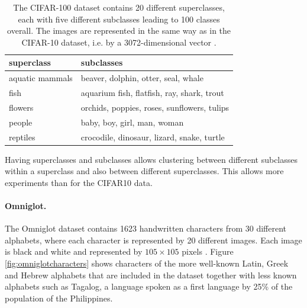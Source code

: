 \begin{table}[h]
    \centering
    \begin{tabular}{|l|l|}
    \hline
    superclass      & subclasses                                  \\ \hline
    aquatic mammals & beaver, dolphin, otter, seal, whale         \\
    fish            & aquarium fish, flatfish, ray, shark, trout  \\
    flowers         & orchids, poppies, roses, sunflowers, tulips \\
    people          & baby, boy, girl, man, woman                 \\ 
    reptiles        & crocodile, dinosaur, lizard, snake, turtle  \\ \hline               
    \end{tabular}
    \caption{The CIFAR-100 dataset contains 20 different superclasses, each with five different subclasses leading to 100 classes overall. The images are represented in the same way as in the CIFAR-10 dataset, i.e. by a 3072-dimensional vector \cite{Krizhevsky2009LearningML}.}
    \label{table:cifar100data}
\end{table}

Having superclasses and subclasses allows clustering between different subclasses within a superclass and also between different superclasses. This allows more experiments than for the CIFAR10 data.

\paragraph{Omniglot.}The Omniglot dataset contains 1623 handwritten characters from 30 different alphabets, where each character is represented by 20 different images. Each image is black and white and represented by $105 \times 105$ pixels \cite{Lake1332}. Figure \ref{fig:omniglotcharacters} shows characters of the more well-known Latin, Greek and Hebrew alphabets that are included in the dataset together with less known alphabets such as Tagalog, a language spoken as a first language by 25\% of the population of the Philippines.

